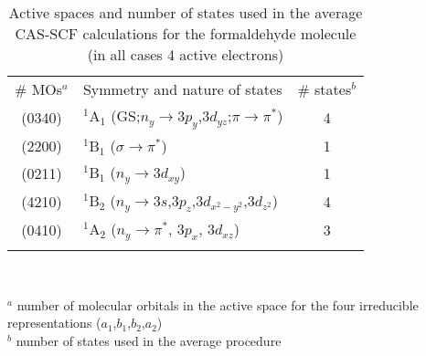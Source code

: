 \documentclass[global,referee]{svjour}
\begin{document}
\begin{table}[b]
\caption{Active spaces and number of states used in the average CAS-SCF calculations
for the formaldehyde molecule (in all cases 4 active electrons)}
\label{Tabforact}       
\begin{tabular}{clc}
\hline\noalign{\smallskip}
\# MOs$^a$ & Symmetry and nature of states    & \# states$^b$ \\
\noalign{\smallskip}\hline\noalign{\smallskip}
    (0340)   & $^1$A$_1$ (GS;$n_y\!\rightarrow\!3p_y$,$3d_{yz}$;$\pi\!\rightarrow\!\pi^*$) & 4 \\
    (2200)   & $^1$B$_1$ ($\sigma\!\rightarrow\!\pi^*$) & 1\\
    (0211)   & $^1$B$_1$ ($n_y\!\rightarrow\! 3d_{xy}$) & 1 \\
    (4210)   & $^1$B$_2$ ($n_y\!\rightarrow\!3s$,$3p_z$,$3d_{x^2\!-\!y^2}$,$3d_{z^2}$) & 4 \\
    (0410)   & $^1$A$_2$ ($n_y\!\rightarrow\! \pi^*$, $3p_x$, $3d_{xz}$) & 3 \\
\noalign{\smallskip}\hline
\end{tabular}\\
{\smallskip}

$^a$ number of molecular orbitals in the active space for 
the four irreducible representations ($a_1$,$b_1$,$b_2$,$a_2$)\\
$^b$ number of states used in the average procedure
\end{table}
\end{document}
